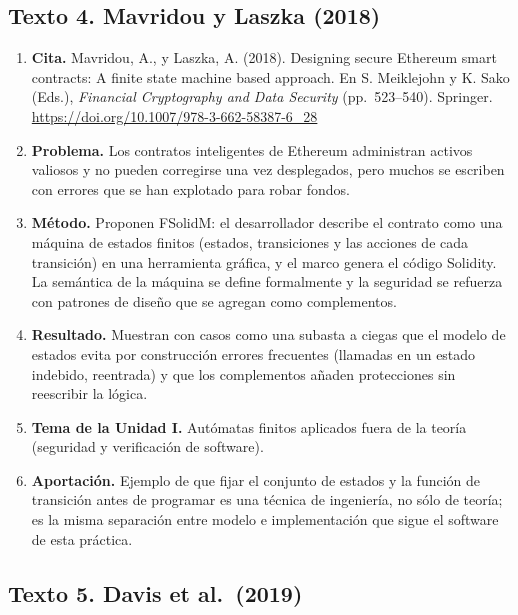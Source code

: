 \hypertarget{texto-4.-mavridou-y-laszka-2018}{%
\subsection{Texto 4. Mavridou y Laszka (2018)}\label{texto-4.-mavridou-y-laszka-2018}}

\begin{enumerate}
\def\labelenumi{\arabic{enumi}.}
\tightlist
\item
  \textbf{Cita.} Mavridou, A., y Laszka, A. (2018). Designing secure Ethereum smart contracts: A finite state machine based approach. En S. Meiklejohn y K. Sako (Eds.), \emph{Financial Cryptography and Data Security} (pp.~523--540). Springer. \url{https://doi.org/10.1007/978-3-662-58387-6_28}
\item
  \textbf{Problema.} Los contratos inteligentes de Ethereum administran activos valiosos y no pueden corregirse una vez desplegados, pero muchos se escriben con errores que se han explotado para robar fondos.
\item
  \textbf{Método.} Proponen FSolidM: el desarrollador describe el contrato como una máquina de estados finitos (estados, transiciones y las acciones de cada transición) en una herramienta gráfica, y el marco genera el código Solidity. La semántica de la máquina se define formalmente y la seguridad se refuerza con patrones de diseño que se agregan como complementos.
\item
  \textbf{Resultado.} Muestran con casos como una subasta a ciegas que el modelo de estados evita por construcción errores frecuentes (llamadas en un estado indebido, reentrada) y que los complementos añaden protecciones sin reescribir la lógica.
\item
  \textbf{Tema de la Unidad I.} Autómatas finitos aplicados fuera de la teoría (seguridad y verificación de software).
\item
  \textbf{Aportación.} Ejemplo de que fijar el conjunto de estados y la función de transición antes de programar es una técnica de ingeniería, no sólo de teoría; es la misma separación entre modelo e implementación que sigue el software de esta práctica.
\end{enumerate}

\hypertarget{texto-5.-davis-et-al.-2019}{%
\subsection{Texto 5. Davis et al.~(2019)}\label{texto-5.-davis-et-al.-2019}}

